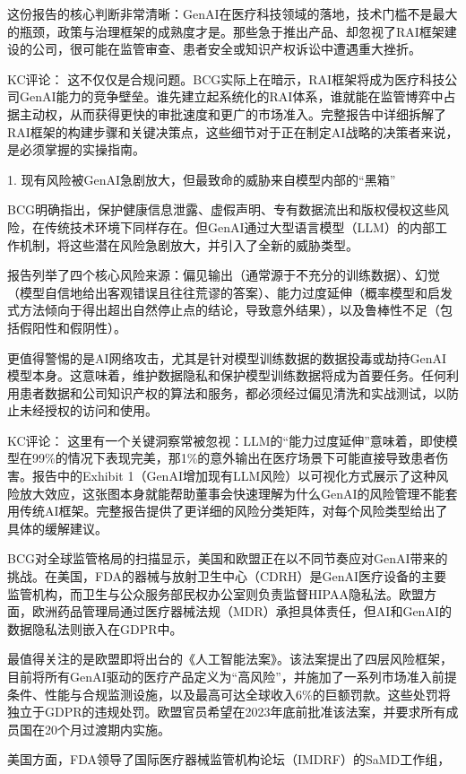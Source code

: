 \documentclass[11pt]{ctexart}
\begin{document}
这份报告的核心判断非常清晰：GenAI在医疗科技领域的落地，技术门槛不是最大的瓶颈，政策与治理框架的成熟度才是。那些急于推出产品、却忽视了RAI框架建设的公司，很可能在监管审查、患者安全或知识产权诉讼中遭遇重大挫折。

KC评论： 这不仅仅是合规问题。BCG实际上在暗示，RAI框架将成为医疗科技公司GenAI能力的竞争壁垒。谁先建立起系统化的RAI体系，谁就能在监管博弈中占据主动权，从而获得更快的审批速度和更广的市场准入。完整报告中详细拆解了RAI框架的构建步骤和关键决策点，这些细节对于正在制定AI战略的决策者来说，是必须掌握的实操指南。

1. 现有风险被GenAI急剧放大，但最致命的威胁来自模型内部的“黑箱”

BCG明确指出，保护健康信息泄露、虚假声明、专有数据流出和版权侵权这些风险，在传统技术环境下同样存在。但GenAI通过大型语言模型（LLM）的内部工作机制，将这些潜在风险急剧放大，并引入了全新的威胁类型。

报告列举了四个核心风险来源：偏见输出（通常源于不充分的训练数据）、幻觉（模型自信地给出客观错误且往往荒谬的答案）、能力过度延伸（概率模型和启发式方法倾向于得出超出自然停止点的结论，导致意外结果），以及鲁棒性不足（包括假阳性和假阴性）。

更值得警惕的是AI网络攻击，尤其是针对模型训练数据的数据投毒或劫持GenAI模型本身。这意味着，维护数据隐私和保护模型训练数据将成为首要任务。任何利用患者数据和公司知识产权的算法和服务，都必须经过偏见清洗和实战测试，以防止未经授权的访问和使用。

KC评论： 这里有一个关键洞察常被忽视：LLM的“能力过度延伸”意味着，即使模型在99\%的情况下表现完美，那1\%的意外输出在医疗场景下可能直接导致患者伤害。报告中的Exhibit 1（GenAI增加现有LLM风险）以可视化方式展示了这种风险放大效应，这张图本身就能帮助董事会快速理解为什么GenAI的风险管理不能套用传统AI框架。完整报告提供了更详细的风险分类矩阵，对每个风险类型给出了具体的缓解建议。

BCG对全球监管格局的扫描显示，美国和欧盟正在以不同节奏应对GenAI带来的挑战。在美国，FDA的器械与放射卫生中心（CDRH）是GenAI医疗设备的主要监管机构，而卫生与公众服务部民权办公室则负责监督HIPAA隐私法。欧盟方面，欧洲药品管理局通过医疗器械法规（MDR）承担具体责任，但AI和GenAI的数据隐私法则嵌入在GDPR中。

最值得关注的是欧盟即将出台的《人工智能法案》。该法案提出了四层风险框架，目前将所有GenAI驱动的医疗产品定义为“高风险”，并施加了一系列市场准入前提条件、性能与合规监测设施，以及最高可达全球收入6\%的巨额罚款。这些处罚将独立于GDPR的违规处罚。欧盟官员希望在2023年底前批准该法案，并要求所有成员国在20个月过渡期内实施。

美国方面，FDA领导了国际医疗器械监管机构论坛（IMDRF）的SaMD工作组，
\end{document}
